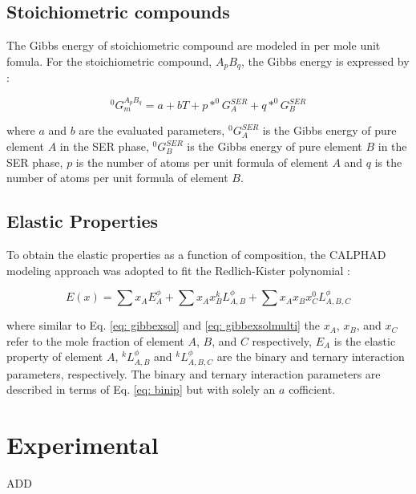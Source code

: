 \subsection{Stoichiometric compounds}

The Gibbs energy of stoichiometric compound are modeled in per mole unit fomula. For the stoichiometric compound, $A_{p}B_{q}$, the Gibbs energy is expressed by \cite{Zacherl2012}: 

\begin{equation}
\label{eq: stoichiometric}
^{0}G_{m}^{A_{p}B_{q}} = a + bT + p * ^{0}G_{A}^{SER} + q * ^{0}G_{B}^{SER}
\end{equation}

\noindent where $a$ and $b$ are the evaluated parameters, $^{0}G_{A}^{SER}$ is the Gibbs energy of pure element $A$ in the SER phase, $^{0}G_{B}^{SER}$ is the Gibbs energy of pure element $B$ in the SER phase, $p$ is the number of atoms per unit formula of element $A$ and $q$ is the number of atoms per unit formula of element $B$.

\subsection{Elastic Properties}

To obtain the elastic properties as a function of composition, the CALPHAD modeling approach was adopted to fit the Redlich-Kister polynomial \cite{Redlich1948b,Shang2010c}: 

\begin{equation}
\label{eq: elastic}
E(x) = \sum x_{A} E_{A}^{\phi} + \sum x_{A} x_{B} ^{k}L_{A,B}^{\phi} + \sum x_{A} x_{B} x_{C} ^{0}L_{A, B, C}^{\phi}
\end{equation}

\noindent where similar to Eq. \ref{eq: gibbexsol} and \ref{eq: gibbexsolmulti} the $x_A$, $x_B$, and $x_C$ refer to the mole fraction of element $A$, $B$, and $C$ respectively, $E_{A}$ is the elastic property of element $A$, $^{k}L_{A,B}^{\phi}$ and $^{k}L_{A,B,C}^{\phi}$ are the binary and ternary interaction parameters, respectively. The binary and ternary interaction parameters are described in terms of Eq. \ref{eq: binip} but with solely an $a$ cofficient. 

\section{Experimental}

ADD

